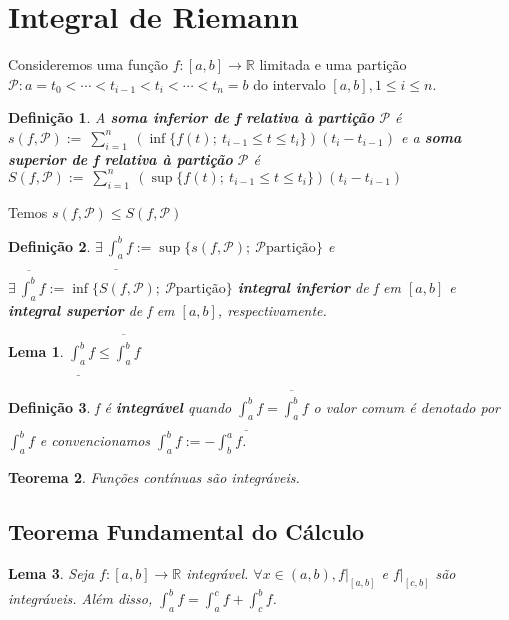 \documentclass[12pt]{article}
\newtheorem{theorem}{Teorema}[section]
\newtheorem{lemma}[theorem]{Lema}
\newtheorem{definition}{Definição}
\begin{document}
\section{Integral de Riemann}
\label{s8}

Consideremos uma função $f: [a, b] \rightarrow{} \mathbb{R}$ limitada e uma partição $\mathcal{P}: a = t_0 < \cdots < t_{i-1} < t_i < \cdots < t_n = b$ do intervalo $[a, b], 1 \leq i \leq n$.

\begin{definition}
    A \textbf{soma inferior de f relativa à partição} $\mathcal{P}$ é $s(f, \mathcal{P}) :=\ \sum_{i = 1}^n\ (\inf \{ f(t);\ t_{i-1} \leq t \leq t_i \}) (t_i - t_{i-1})$ e a \textbf{soma superior de f relativa à partição} $\mathcal{P}$ é $S(f, \mathcal{P}) :=\ \sum_{i = 1}^n\ (\sup \{ f(t);\ t_{i-1} \leq t \leq t_i \}) (t_i - t_{i-1})$
\end{definition}

Temos $s(f, \mathcal{P}) \leq S(f, \mathcal{P})$

\begin{definition}
    $\exists \ \underline{\int_{a}^b} f := \sup \{s(f, \mathcal{P}) ;\ \mathcal{P} \text{partição} \}$ e $\exists \ \overline{\int_{a}^b} f := \inf \{S(f, \mathcal{P}) ;\ \mathcal{P} \text{partição} \}$ \textbf{integral inferior} de f em $[a, b]$ e \textbf{integral superior} de f em $[a, b]$, respectivamente.
\end{definition}

\begin{lemma}
    $\underline{\int_{a}^b} f \leq \overline{\int_{a}^b} f$
\end{lemma}

\begin{definition}
    f é \textbf{integrável} quando $\underline{\int_{a}^b} f = \overline{\int_{a}^b} f$ o valor comum é denotado por $\int_a^b f$ e convencionamos $\int_a^b f := - \int_b^a f$.
\end{definition}

\begin{theorem}
    Funções contínuas são integráveis.
\end{theorem}

\subsection{Teorema Fundamental do Cálculo}
\label{s9}

\begin{lemma}
    Seja $f: [a, b] \rightarrow{} \mathbb{R}$ integrável. $\forall x \in (a, b), f|_{[a, b]}$ e $f|_{[c, b]}$ são integráveis. Além disso, $\int_a^b f = \int_a^c f + \int_c^b f$.
\end{lemma}
\end{document}
